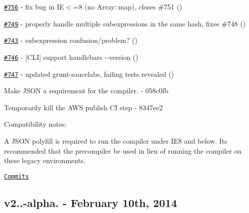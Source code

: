 \begin{DoxyItemize}
\item \href{https://github.com/wycats/handlebars.js/pull/756}{\tt \#756} -\/ fix bug in IE$<$=8 (no Array\+::map), closes \#751 (\href{https://api.github.com/users/jenseng}{\tt })
\item \href{https://github.com/wycats/handlebars.js/pull/749}{\tt \#749} -\/ properly handle multiple subexpressions in the same hash, fixes \#748 (\href{https://api.github.com/users/jenseng}{\tt })
\item \href{https://github.com/wycats/handlebars.js/issues/743}{\tt \#743} -\/ subexpression confusion/problem? (\href{https://api.github.com/users/waynedpj}{\tt })
\item \href{https://github.com/wycats/handlebars.js/issues/746}{\tt \#746} -\/ \mbox{[}C\+LI\mbox{]} support {\ttfamily handlebars -\/-\/version} (\href{https://api.github.com/users/apfelbox}{\tt })
\item \href{https://github.com/wycats/handlebars.js/pull/747}{\tt \#747} -\/ updated grunt-\/saucelabs, failing tests revealed (\href{https://api.github.com/users/Jonahss}{\tt })
\item Make J\+S\+ON a requirement for the compiler. -\/ 058c0fb
\item Temporarily kill the A\+WS publish CI step -\/ 8347ee2
\end{DoxyItemize}

Compatibility notes\+:
\begin{DoxyItemize}
\item A J\+S\+ON polyfill is required to run the compiler under I\+E8 and below. It\textquotesingle{}s recommended that the precompiler be used in lieu of running the compiler on these legacy environments.
\end{DoxyItemize}

\href{https://github.com/wycats/handlebars.js/compare/v2.0.0-alpha.1...v2.0.0-alpha.2}{\tt Commits}

\subsection*{v2..-\/alpha. -\/ February 10th, 2014}


